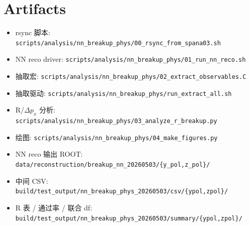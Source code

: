 \documentclass[a4paper,11pt]{article}
\begin{document}
\section*{Artifacts}
\begin{itemize}[nosep]
    \item rsync 脚本: \texttt{scripts/analysis/nn\_breakup\_phys/00\_rsync\_from\_spana03.sh}
    \item NN reco driver: \texttt{scripts/analysis/nn\_breakup\_phys/01\_run\_nn\_reco.sh}
    \item 抽取宏: \texttt{scripts/analysis/nn\_breakup\_phys/02\_extract\_observables.C}
    \item 抽取驱动: \texttt{scripts/analysis/nn\_breakup\_phys/run\_extract\_all.sh}
    \item R/$\Delta p_x$ 分析: \texttt{scripts/analysis/nn\_breakup\_phys/03\_analyze\_r\_breakup.py}
    \item 绘图: \texttt{scripts/analysis/nn\_breakup\_phys/04\_make\_figures.py}
    \item NN reco 输出 ROOT: \texttt{data/reconstruction/breakup\_nn\_20260503/\{y\_pol,z\_pol\}/}
    \item 中间 CSV: \texttt{build/test\_output/nn\_breakup\_phys\_20260503/csv/\{ypol,zpol\}/}
    \item R 表 / 通过率 / 联合 df: \texttt{build/test\_output/nn\_breakup\_phys\_20260503/summary/\{ypol,zpol\}/}
\end{itemize}
\end{document}
